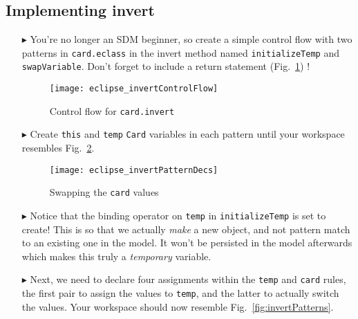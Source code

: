 \newpage
\hypertarget{invertCard tex}{}
\subsection{Implementing invert}
\texHeader

\begin{itemize}

\item[$\blacktriangleright$] You're no longer an SDM beginner, so create a simple control flow with two patterns in \texttt{card.eclass} in the invert
method named \texttt{initializeTemp} and \texttt{swapVariable}. Don't forget to include a return statement (Fig.~\ref{fig:eclipse_invert}) !

\begin{figure}[htbp]
\begin{center}
  \texttt{[image: eclipse\_invertControlFlow]}
  \caption{Control flow for \texttt{card.invert}}  
  \label{fig:eclipse_invert}
\end{center}
\end{figure}

\item[$\blacktriangleright$] Create \texttt{this} and \texttt{temp} \texttt{Card} variables in each pattern until your workspace resembles
Fig.~\ref{fig:invertPatternsDecs}.

\begin{figure}[htbp]
\begin{center}
  \texttt{[image: eclipse\_invertPatternDecs]}
  \caption{Swapping the \texttt{card} values}  
  \label{fig:invertPatternsDecs}
\end{center}
\end{figure}

\item[$\blacktriangleright$] Notice that the binding operator on \texttt{temp} in \texttt{initializeTemp} is set to create! This is so that we actually
\emph{make} a new object, and not pattern match to an existing one in the model. It won't be persisted in the model afterwards which makes this truly a
\emph{temporary} variable.

\item[$\blacktriangleright$] Next, we need to declare four assignments within the \texttt{temp} and \texttt{card} rules, the first pair to assign the values to
\texttt{temp}, and the latter to actually switch the values. Your workspace should now resemble Fig.~\ref{fig:invertPatterns}.


\end{itemize}
